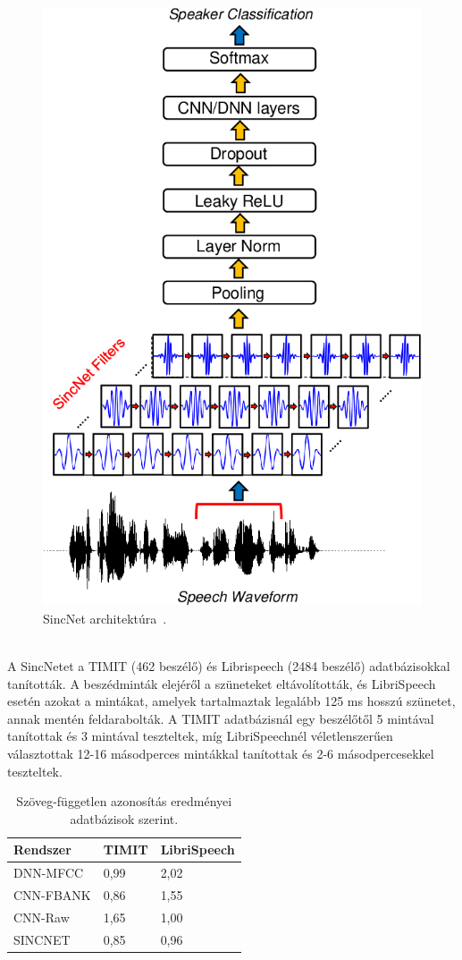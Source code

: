 \begin{figure}[!ht]
	\centering
	\includegraphics[width=120mm, keepaspectratio]{figures/sincnet-nn.png}
	\caption{SincNet architektúra~\cite{sincnet}.}
	\label{fig:sincnet-nn}
\end{figure}
\ \\
\newline
A SincNetet a TIMIT (462 beszélő) és Librispeech (2484 beszélő) adatbázisokkal tanították.
A beszédminták elejéről a szüneteket eltávolították, és LibriSpeech esetén azokat a mintákat, amelyek tartalmaztak legalább 125 ms hosszú szünetet, annak mentén feldarabolták. A TIMIT adatbázisnál egy beszélőtől 5 mintával tanítottak és 3 mintával teszteltek, míg LibriSpeechnél véletlenszerűen választottak 12-16 másodperces mintákkal tanítottak és 2-6 másodpercesekkel teszteltek.
\newline
\begin{table}[!ht]
	\begin{tabular}{*3l} \toprule
		\bfseries Rendszer & \bfseries TIMIT & \bfseries LibriSpeech \\ \midrule
		DNN-MFCC & 0,99 & 2,02 \\
		\rowcolor{gray!10} 
		CNN-FBANK & 0,86 & 1,55 \\
		CNN-Raw  & 1,65 & 1,00 \\
		\rowcolor{gray!10} 
		SINCNET & 0,85 & 0,96 \\
		\bottomrule
		\hline
	\end{tabular}
	\centering
	\caption{Szöveg-független azonosítás eredményei adatbázisok szerint.}
	\label{fig:sincnet-identification}
\end{table}
